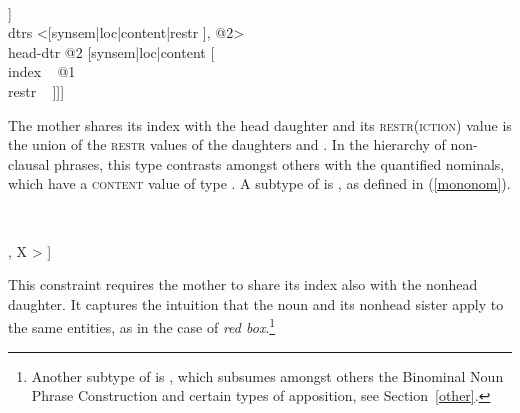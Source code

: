 \documentclass[output=paper
	        ,collection
	        ,collectionchapter
 	        ,biblatex
                ,babelshorthands
                ,newtxmath
                ,draftmode
                ,colorlinks, citecolor=brown
]{langscibook}
\begin{document}
\begin{exe}
\ex\label{param} 
 ~ \impl ~
\begin{avm}
[synsem|loc [category|head ~ \type{noun}                              \\
             content [\type{parameter}                               \\
                      index ~ @1                                       \\
                      restr ~ \ibox{\Sigma_{1}} $\cup$ \ibox{\Sigma_{2}}]] \\
 dtrs <[synsem|loc|content|restr  ], @2>     \\
 head-dtr @2 [synsem|loc|content [                  \\
                                    index ~ @1                         \\
                                    restr ~  ]]]
\end{avm}
\end{exe}

\noindent
The mother shares its index with the head daughter  and 
its \textsc{restr(iction)} value is the union of the \textsc{restr} values 
of the daughters  and . 
In the hierarchy of non-clausal phrases, this type contrasts amongst others with 
the quantified nominals, which have a \textsc{content} value of type 
 \citep[203--205]{GS00}. A subtype of  is  
, as defined in (\ref{mononom}).

\begin{exe}
\ex\label{mononom} 
 ~ \impl ~ 
\begin{avm}
[synsem|loc|content|index ~ @1      \\
 dtrs <[synsem|loc|content|index ~ @1 ], X > ]
\end{avm}
\end{exe}

\noindent 
This constraint requires the mother to share its index also with the 
nonhead daughter. It captures the intuition that the 
noun and its nonhead sister apply to the same entities, as in 
the case of \emph{red box}.\footnote{Another subtype of  
is , which subsumes amongst others 
the Binominal Noun Phrase Construction and certain types of apposition,
see Section~\ref{other}.}  
\end{document}
